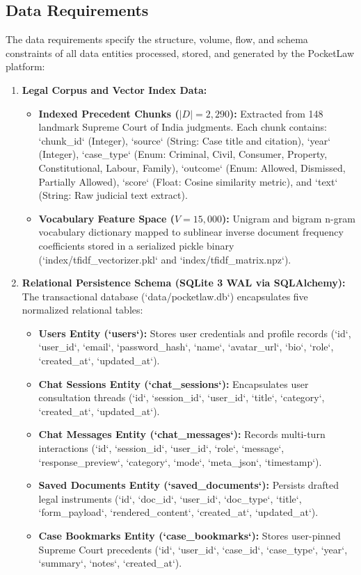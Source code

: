\subsection{Data Requirements}
\label{subsec:data_requirements}

The data requirements specify the structure, volume, flow, and schema constraints of all data entities processed, stored, and generated by the PocketLaw platform:

\begin{enumerate}
    \item \textbf{Legal Corpus and Vector Index Data:}
    \begin{itemize}
        \item \textbf{Indexed Precedent Chunks ($|D| = 2,290$):} Extracted from 148 landmark Supreme Court of India judgments. Each chunk contains: `chunk_id` (Integer), `source` (String: Case title and citation), `year` (Integer), `case_type` (Enum: Criminal, Civil, Consumer, Property, Constitutional, Labour, Family), `outcome` (Enum: Allowed, Dismissed, Partially Allowed), `score` (Float: Cosine similarity metric), and `text` (String: Raw judicial text extract).
        \item \textbf{Vocabulary Feature Space ($V = 15,000$):} Unigram and bigram n-gram vocabulary dictionary mapped to sublinear inverse document frequency coefficients stored in a serialized pickle binary (`index/tfidf_vectorizer.pkl` and `index/tfidf_matrix.npz`).
    \end{itemize}
    
    \item \textbf{Relational Persistence Schema (SQLite 3 WAL via SQLAlchemy):}
    The transactional database (`data/pocketlaw.db`) encapsulates five normalized relational tables:
    \begin{itemize}
        \item \textbf{Users Entity (`users`):} Stores user credentials and profile records (`id`, `user_id`, `email`, `password_hash`, `name`, `avatar_url`, `bio`, `role`, `created_at`, `updated_at`).
        \item \textbf{Chat Sessions Entity (`chat_sessions`):} Encapsulates user consultation threads (`id`, `session_id`, `user_id`, `title`, `category`, `created_at`, `updated_at`).
        \item \textbf{Chat Messages Entity (`chat_messages`):} Records multi-turn interactions (`id`, `session_id`, `user_id`, `role`, `message`, `response_preview`, `category`, `mode`, `meta_json`, `timestamp`).
        \item \textbf{Saved Documents Entity (`saved_documents`):} Persists drafted legal instruments (`id`, `doc_id`, `user_id`, `doc_type`, `title`, `form_payload`, `rendered_content`, `created_at`, `updated_at`).
        \item \textbf{Case Bookmarks Entity (`case_bookmarks`):} Stores user-pinned Supreme Court precedents (`id`, `user_id`, `case_id`, `case_type`, `year`, `summary`, `notes`, `created_at`).
    \end{itemize}
    

\end{enumerate}
